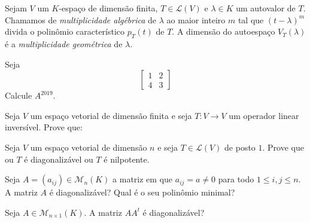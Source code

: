\documentclass[11pt,a4paper]{article}
\begin{document}
  Sejam $V$ um $K$-espaço de dimensão finita, $T \in\mathcal{L}(V)$ e $\lambda \in K$ um autovalor de $T.$ Chamamos de \emph{multiplicidade algébrica} de $\lambda$ ao maior inteiro $m$ tal que $(t - \lambda)^m$ divida o polinômio característico $p_T(t)$ de $T.$ A dimensão do autoespaço $V_T(\lambda)$ é a \emph{multiplicidade geométrica} de $\lambda.$
 
   \solucao{}
   
      Seja
    \[
    \begin{bmatrix} 1 & 2 \\ 4 & 3 \end{bmatrix}
    \]
    Calcule $A^{2019}.$
    
      \solucao{}
   
      Seja $V$ um espaço vetorial de dimensão finita e seja $T \colon V \to V$ um operador linear inversível. Prove que:
    
      \solucao{}
   
     Seja $V$ um espaço vetorial de dimensão $n$ e seja $T \in \mathcal{L}(V)$ de posto $1.$ Prove que ou $T$ é diagonalizável ou $T$ é nilpotente. 
    
     \solucao{}
   
     Seja $A = (a_{ij}) \in \mathcal{M}_n(K)$ a matriz em que $a_{ij} = a \neq 0$ para todo $1 \le i, j \le n.$ A matriz $A$ é diagonalizável? Qual é o seu polinômio minimal?
    
     \solucao{}
   
     Seja $A \in \mathcal{M}_{n \times 1}(K).$ A matriz $AA^t$ é diagonalizável?
    
\end{document}

